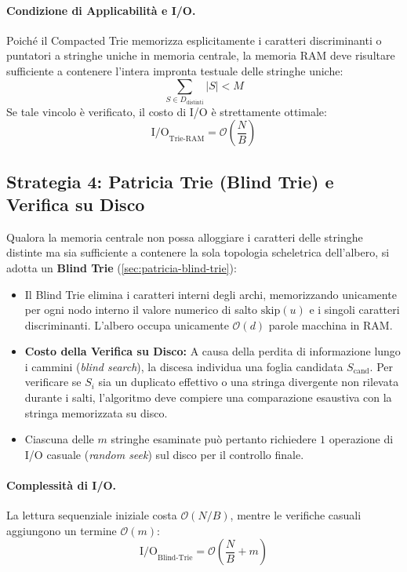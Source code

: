 \paragraph{Condizione di Applicabilità e I/O.}
Poich\'e il Compacted Trie memorizza esplicitamente i caratteri discriminanti o puntatori a stringhe uniche in memoria centrale, la memoria RAM deve risultare sufficiente a contenere l'intera impronta testuale delle stringhe uniche:
\begin{equation}
  \sum_{S \in D_{\text{distinti}}} |S| < M
\end{equation}
Se tale vincolo \`e verificato, il costo di I/O \`e strettamente ottimale:
\begin{equation}
  \text{I/O}_{\text{Trie-RAM}} = \mathcal{O}\left(\frac{N}{B}\right)
\end{equation}

\FloatBarrier
\subsection{Strategia 4: Patricia Trie (Blind Trie) e Verifica su Disco}
\label{subsec:soluzione-4-patricia-blind-trie}

Qualora la memoria centrale non possa alloggiare i caratteri delle stringhe distinte ma sia sufficiente a contenere la sola topologia scheletrica dell'albero, si adotta un \textbf{Blind Trie} (\autoref{sec:patricia-blind-trie}):
\begin{itemize}
  \item Il Blind Trie elimina i caratteri interni degli archi, memorizzando unicamente per ogni nodo interno il valore numerico di salto $\text{skip}(u)$ e i singoli caratteri discriminanti. L'albero occupa unicamente $\mathcal{O}(d)$ parole macchina in RAM.
  \item \textbf{Costo della Verifica su Disco:} A causa della perdita di informazione lungo i cammini (\textit{blind search}), la discesa individua una foglia candidata $S_{\text{cand}}$. Per verificare se $S_i$ sia un duplicato effettivo o una stringa divergente non rilevata durante i salti, l'algoritmo deve compiere una comparazione esaustiva con la stringa memorizzata su disco.
  \item Ciascuna delle $m$ stringhe esaminate pu\`o pertanto richiedere $1$ operazione di I/O casuale (\textit{random seek}) sul disco per il controllo finale.
\end{itemize}

\paragraph{Complessità di I/O.}
La lettura sequenziale iniziale costa $\mathcal{O}(N/B)$, mentre le verifiche casuali aggiungono un termine $\mathcal{O}(m)$:
\begin{equation}
  \text{I/O}_{\text{Blind-Trie}} = \mathcal{O}\left(\frac{N}{B} + m\right)
\end{equation}

